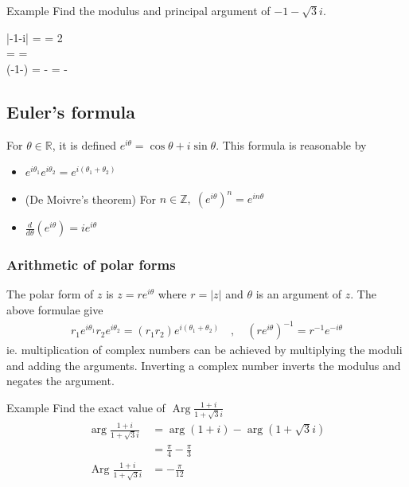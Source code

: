 \documentclass{report}
\renewcommand{\Arg}{\operatorname{Arg}}
\begin{document}
			\begin{question}{Example}
				Find the modulus and principal argument of $-1 -\sqrt{3}i$.
					\begin{flalign*}
						|-1-\sqrt{3}i| = \sqrt{1^2 + ()^2} = 2	\\
						\arctan {} = \arctan {} = 		\\
						 (-1-) =  - \pi = -\frac{2\pi}{3}
					\end{flalign*}
			\end{question}

		\subsection{Euler's formula}

			For $\theta \in \mathbb{R}$, it is defined $e^{i\theta} = \cos \theta + i \sin \theta$. This formula is reasonable by
			
			\begin{itemize}
				\item $e^{i \theta_1}e^{i \theta_2} = e^{i(\theta_1+\theta_2)}$
				\item (De Moivre's theorem) For $n \in \mathbb{Z},\; \left(e^{i\theta}\right)^n = e^{in\theta}$
				\item $\frac{d}{d\theta} (e^{i \theta}) = ie^{i\theta}$
			\end{itemize}

			\subsubsection{Arithmetic of polar forms}
				
				The polar form of $z$ is $z = re^{i\theta}$ where $r = |z|$ and $\theta$ is an argument of $z$. The above formulae give
				\begin{align*}
					r_1 e^{i\theta_1} r_2 e^{i\theta_2} = (r_1 r_2) e^{i(\theta_1+\theta_2)} \quad , \quad \left(re^{i\theta}\right)^{-1} = r^{-1}e^{-i\theta}
				\end{align*}
				ie. multiplication of complex numbers can be achieved by multiplying the moduli and adding the arguments. Inverting a complex number inverts the modulus and negates the argument.

				\begin{question}{Example}
					Find the exact value of $\operatorname{Arg} \frac{1+i}{1+\sqrt{3}i}$
					\begin{align*}
						\arg \frac{1+i}{1+\sqrt{3}i} &= \arg(1+i) - \arg(1+\sqrt{3}i)	\\
													 &= \frac{\pi}{4} - \frac{\pi}{3}	\\
						\Arg \frac{1+i}{1+\sqrt{3}i} &= -\frac{\pi}{12}					\\
					\end{align*}
				\end{question}
\end{document}
